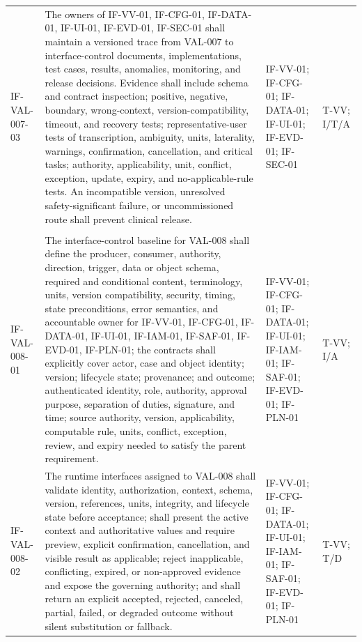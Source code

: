 \documentclass[11pt,letterpaper]{article}
\begin{document}
\begin{scriptsize}
\begin{longtable}{@{}L{0.14\textwidth}L{0.49\textwidth}L{0.19\textwidth}L{0.10\textwidth}@{}}
\addlinespace[2pt]
\mbox{IF-VAL-007-03} & The owners of IF-VV-01, IF-CFG-01, IF-DATA-01, IF-UI-01, IF-EVD-01, IF-SEC-01 shall maintain a versioned trace from VAL-007 to interface-control documents, implementations, test cases, results, anomalies, monitoring, and release decisions. Evidence shall include schema and contract inspection; positive, negative, boundary, wrong-context, version-compatibility, timeout, and recovery tests; representative-user tests of transcription, ambiguity, units, laterality, warnings, confirmation, cancellation, and critical tasks; authority, applicability, unit, conflict, exception, update, expiry, and no-applicable-rule tests. An incompatible version, unresolved safety-significant failure, or uncommissioned route shall prevent clinical release. & IF-VV-01; IF-CFG-01; IF-DATA-01; IF-UI-01; IF-EVD-01; IF-SEC-01 & T-VV; I\slash\allowbreak{}T\slash\allowbreak{}A \\
\addlinespace[2pt]
 \\
\addlinespace[2pt]
\mbox{IF-VAL-008-01} & The interface-control baseline for VAL-008 shall define the producer, consumer, authority, direction, trigger, data or object schema, required and conditional content, terminology, units, version compatibility, security, timing, state preconditions, error semantics, and accountable owner for IF-VV-01, IF-CFG-01, IF-DATA-01, IF-UI-01, IF-IAM-01, IF-SAF-01, IF-EVD-01, IF-PLN-01; the contracts shall explicitly cover actor, case and object identity; version; lifecycle state; provenance; and outcome; authenticated identity, role, authority, approval purpose, separation of duties, signature, and time; source authority, version, applicability, computable rule, units, conflict, exception, review, and expiry needed to satisfy the parent requirement. & IF-VV-01; IF-CFG-01; IF-DATA-01; IF-UI-01; IF-IAM-01; IF-SAF-01; IF-EVD-01; IF-PLN-01 & T-VV; I\slash\allowbreak{}A \\
\addlinespace[2pt]
\mbox{IF-VAL-008-02} & The runtime interfaces assigned to VAL-008 shall validate identity, authorization, context, schema, version, references, units, integrity, and lifecycle state before acceptance; shall present the active context and authoritative values and require preview, explicit confirmation, cancellation, and visible result as applicable; reject inapplicable, conflicting, expired, or non-approved evidence and expose the governing authority; and shall return an explicit accepted, rejected, canceled, partial, failed, or degraded outcome without silent substitution or fallback. & IF-VV-01; IF-CFG-01; IF-DATA-01; IF-UI-01; IF-IAM-01; IF-SAF-01; IF-EVD-01; IF-PLN-01 & T-VV; T\slash\allowbreak{}D \\

\end{longtable}
\end{scriptsize}
\end{document}

